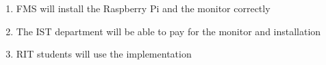\begin{enumerate}
	\item FMS will install the Raspberry Pi and the monitor correctly
	\item The IST department will be able to pay for the monitor and installation
	\item RIT students will use the implementation
\end{enumerate}